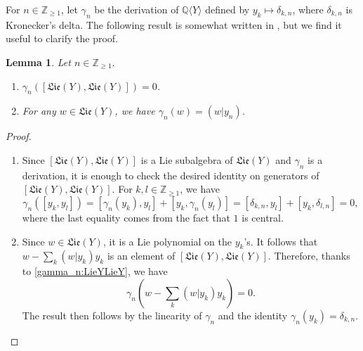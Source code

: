 \documentclass[11pt, a4paper]{amsart}
\newtheorem{lemma}[theorem]{Lemma}
\numberwithin{equation}{section}
\theoremstyle{definition}
\newcommand{\Q}{\mathbb{Q}}
\newcommand{\QY}{\Q\langle Y\rangle}
\newcommand{\Lie}{\mathfrak{Lie}}
\begin{document}
For $n \in \mathbb{Z}_{\geq 1}$, let $\gamma_n$ be the derivation of $\QY$ defined by $y_k \mapsto \delta_{k,n}$, where $\delta_{k,n}$ is Kronecker's delta. The following result is somewhat written in \cite[Proposition 2.3.8]{Ra02}, but we find it useful to clarify the proof.
\begin{lemma} Let $n\in\mathbb{Z}_{\geq 1}.$
    \begin{enumerate}[leftmargin=*, label=(\alph*)]
        \item \label{gamma_n:LieYLieY} $\gamma_n([\Lie(Y), \Lie(Y)]) = 0$.
        \item \label{gamma_n:w} For any $w \in \Lie(Y)$, we have $\gamma_n(w) = (w | y_n)$.
    \end{enumerate}
    \label{lem:gamma_n}
\end{lemma}
\begin{proof}
    \begin{enumerate}[leftmargin=*, label=(\alph*)]
        \item Since $[\Lie(Y), \Lie(Y)]$ is a Lie subalgebra of $\Lie(Y)$ and $\gamma_n$ is a derivation, it is enough to check the desired identity on generators of $[\Lie(Y), \Lie(Y)]$. For $k,l \in \mathbb{Z}_{\geq 1}$, we have
        \[
            \gamma_n([y_k, y_l]) = [\gamma_n(y_k), y_l] + [y_k, \gamma_n(y_l)] = [\delta_{k,n}, y_l] + [y_k, \delta_{l,n}] = 0,   
        \]
        where the last equality comes from the fact that $1$ is central.
        \item Since $w \in \Lie(Y)$, it is a Lie polynomial on the $y_k$'s. It follows that $w - \sum_{k} (w | y_k) y_k$ is an element of $[\Lie(Y), \Lie(Y)]$. Therefore, thanks to \ref{gamma_n:LieYLieY}, we have
        \[
            \gamma_n\left(w - \sum_{k} (w | y_k) y_k\right) = 0.
        \]
        The result then follows by the linearity of $\gamma_n$ and the identity $\gamma_n(y_k) = \delta_{k,n}$.
    \end{enumerate}
\end{proof}
\end{document}
